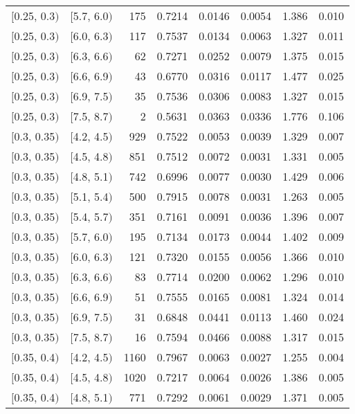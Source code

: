 \begin{longtable}{| l | l | r | r | r | r | r | r |}
        $[$0.25, 0.3$)$ & $[$5.7, 6.0$)$ & 175 & 0.7214 & 0.0146 & 0.0054 & 1.386 & 0.010 \\
        $[$0.25, 0.3$)$ & $[$6.0, 6.3$)$ & 117 & 0.7537 & 0.0134 & 0.0063 & 1.327 & 0.011 \\
        $[$0.25, 0.3$)$ & $[$6.3, 6.6$)$ & 62 & 0.7271 & 0.0252 & 0.0079 & 1.375 & 0.015 \\
        $[$0.25, 0.3$)$ & $[$6.6, 6.9$)$ & 43 & 0.6770 & 0.0316 & 0.0117 & 1.477 & 0.025 \\
        $[$0.25, 0.3$)$ & $[$6.9, 7.5$)$ & 35 & 0.7536 & 0.0306 & 0.0083 & 1.327 & 0.015 \\
        $[$0.25, 0.3$)$ & $[$7.5, 8.7$)$ & 2 & 0.5631 & 0.0363 & 0.0336 & 1.776 & 0.106 \\
        $[$0.3, 0.35$)$ & $[$4.2, 4.5$)$ & 929 & 0.7522 & 0.0053 & 0.0039 & 1.329 & 0.007 \\
        $[$0.3, 0.35$)$ & $[$4.5, 4.8$)$ & 851 & 0.7512 & 0.0072 & 0.0031 & 1.331 & 0.005 \\
        $[$0.3, 0.35$)$ & $[$4.8, 5.1$)$ & 742 & 0.6996 & 0.0077 & 0.0030 & 1.429 & 0.006 \\
        $[$0.3, 0.35$)$ & $[$5.1, 5.4$)$ & 500 & 0.7915 & 0.0078 & 0.0031 & 1.263 & 0.005 \\
        $[$0.3, 0.35$)$ & $[$5.4, 5.7$)$ & 351 & 0.7161 & 0.0091 & 0.0036 & 1.396 & 0.007 \\
        $[$0.3, 0.35$)$ & $[$5.7, 6.0$)$ & 195 & 0.7134 & 0.0173 & 0.0044 & 1.402 & 0.009 \\
        $[$0.3, 0.35$)$ & $[$6.0, 6.3$)$ & 121 & 0.7320 & 0.0155 & 0.0056 & 1.366 & 0.010 \\
        $[$0.3, 0.35$)$ & $[$6.3, 6.6$)$ & 83 & 0.7714 & 0.0200 & 0.0062 & 1.296 & 0.010 \\
        $[$0.3, 0.35$)$ & $[$6.6, 6.9$)$ & 51 & 0.7555 & 0.0165 & 0.0081 & 1.324 & 0.014 \\
        $[$0.3, 0.35$)$ & $[$6.9, 7.5$)$ & 31 & 0.6848 & 0.0441 & 0.0113 & 1.460 & 0.024 \\
        $[$0.3, 0.35$)$ & $[$7.5, 8.7$)$ & 16 & 0.7594 & 0.0466 & 0.0088 & 1.317 & 0.015 \\
        $[$0.35, 0.4$)$ & $[$4.2, 4.5$)$ & 1160 & 0.7967 & 0.0063 & 0.0027 & 1.255 & 0.004 \\
        $[$0.35, 0.4$)$ & $[$4.5, 4.8$)$ & 1020 & 0.7217 & 0.0064 & 0.0026 & 1.386 & 0.005 \\
        $[$0.35, 0.4$)$ & $[$4.8, 5.1$)$ & 771 & 0.7292 & 0.0061 & 0.0029 & 1.371 & 0.005 \\

\end{longtable}
